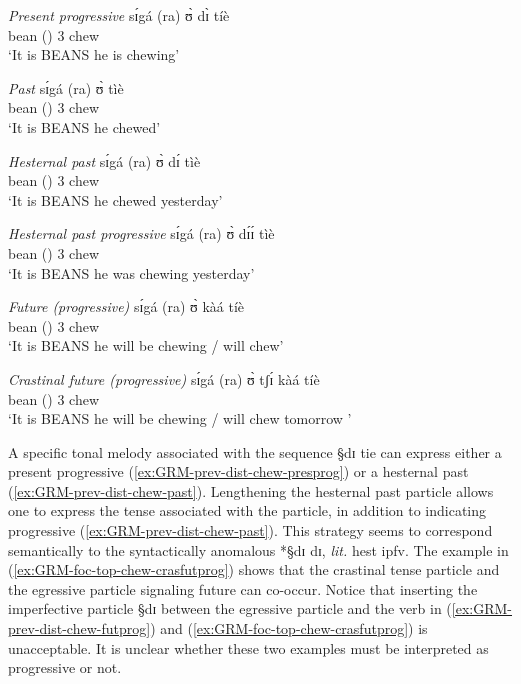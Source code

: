 \begin{exe} 
\ex\label{ex:GRM-prev-dist}
\begin{xlist}
\ex\label{ex:GRM-prev-dist-chew-presprog}{\it Present progressive}
\gll  sɪ́gá (ra)  ʊ̀ dɪ̀  tíè   \\
 bean  ({\foc}) {3\sg} {\ipfv} chew\\
\glt `It is BEANS he is chewing'

 \ex\label{ex:GRM-prev-dist-chew-past}{\it Past}
\gll  sɪ́gá (ra) ʊ̀   tìè     \\
 bean  ({\foc}) {3\sg}  chew \\
\glt `It is BEANS he chewed'


 \ex\label{ex:GRM-prev-dist-chew-past}{\it Hesternal past}
\gll  sɪ́gá (ra) ʊ̀ dɪ́    tìè     \\
 bean  ({\foc}) {3\sg} {\hest}  chew \\
\glt `It is BEANS he chewed yesterday'


 \ex\label{ex:GRM-prev-dist-chew-past}{\it Hesternal past progressive}
\gll  sɪ́gá (ra) ʊ̀ dɪ́ɪ́    tìè     \\
 bean  ({\foc}) {3\sg} {\hest}  chew \\
\glt `It is BEANS he was chewing yesterday'

 \ex\label{ex:GRM-prev-dist-chew-futprog}{\it Future (progressive)}
\gll  sɪ́gá (ra) ʊ̀  kàá   tíè     \\
 bean  ({\foc}) {3\sg} {\fut}  chew \\
\glt `It is BEANS he will be chewing / will chew'

 \ex\label{ex:GRM-foc-top-chew-crasfutprog}{\it Crastinal future (progressive)}
\gll  sɪ́gá (ra) ʊ̀ tʃɪ́  kàá   tíè     \\
 bean  ({\foc}) {3\sg} {\cras} {\fut}   chew \\
\glt `It is BEANS he will be chewing / will chew tomorrow '

\end{xlist}
\end{exe} 

A specific tonal melody associated with  the sequence {\S dɪ tie} can express
either a present progressive (\ref{ex:GRM-prev-dist-chew-presprog}) or a
hesternal past (\ref{ex:GRM-prev-dist-chew-past}). Lengthening the hesternal
past particle allows one to express the tense associated with the particle, in
addition to indicating  progressive (\ref{ex:GRM-prev-dist-chew-past}). This
strategy seems to correspond semantically  to the syntactically anomalous
*{\S dɪ dɪ},  {\it lit.} {\sc hest} {\sc ipfv}.  The example in
(\ref{ex:GRM-foc-top-chew-crasfutprog}) shows that the crastinal tense particle
and the egressive particle signaling  future  can co-occur. Notice that
inserting the imperfective particle {\S  dɪ} between the egressive particle and
the verb in  (\ref{ex:GRM-prev-dist-chew-futprog}) and
(\ref{ex:GRM-foc-top-chew-crasfutprog}) is  unacceptable. It is unclear whether
these two
examples must be interpreted as progressive or not.  



